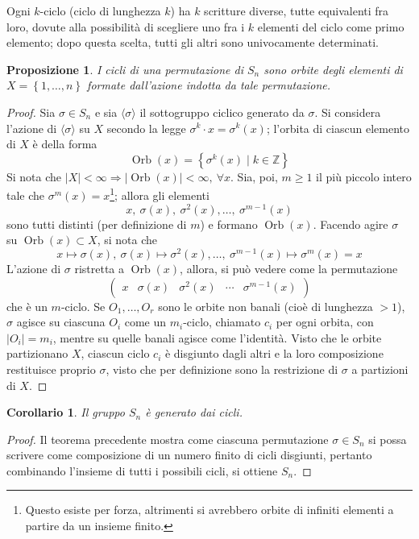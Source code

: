 \documentclass[12pt]{scrartcl}
\theoremstyle{style}
\newtheorem{prop}{Proposizione}[section]
\newtheorem{corollario}{Corollario}[teorema]
\numberwithin{equation}{subsection}
\begin{document}
Ogni $k$-ciclo (ciclo di lunghezza $k$) ha $k$ scritture diverse, tutte equivalenti fra loro, dovute alla possibilit\`a di scegliere uno fra i $k$ elementi del ciclo come primo elemento; dopo questa scelta, tutti gli altri sono univocamente determinati.
\begin{prop}
	I cicli di una permutazione di $S_n$ sono orbite degli elementi di $X = \left\{ 1,\ldots,n \right\} $ formate dall'azione indotta da tale permutazione.
\end{prop}
	\begin{proof}
		Sia $\sigma \in S_n$ e sia $\langle \sigma  \rangle$ il sottogruppo ciclico generato da $\sigma $.
		Si considera l'azione di $\langle \sigma  \rangle$ su $X$ secondo la legge $\sigma ^k \cdot x = \sigma ^k (x)$; l'orbita di ciascun elemento di $X$ \`e della forma
		\[
		\operatorname{Orb} (x) = \left\{ \sigma ^k(x)  \mid  k \in \mathbb{Z} \right\} 
		\] 
		Si nota che $\lvert X \rvert < \infty \Rightarrow  \lvert \operatorname{Orb} (x) \rvert < \infty, \ \forall x$. 
		Sia, poi, $m\ge 1$ il pi\`u piccolo intero tale che $\sigma ^m(x) = x$\footnote{Questo esiste per forza, altrimenti si avrebbero orbite di infiniti elementi a partire da un insieme finito.}; allora gli elementi 
		\[
		x, \ \sigma (x) , \ \sigma ^2 (x) , \ldots,\ \sigma ^{m-1} (x)
		\] 
		sono tutti distinti (per definizione di $m$) e formano $\operatorname{Orb} (x)$.
		Facendo agire $\sigma $ su $\operatorname{Orb} (x) \subset X$, si nota che 
		\[
		x \mapsto \sigma (x) , \ \sigma (x) \mapsto \sigma ^2(x) ,\ldots, \ \sigma ^{m-1} (x) \mapsto \sigma ^m(x) = x
		\] 
		L'azione di $\sigma $ ristretta a $\operatorname{Orb} (x)$, allora, si pu\`o vedere come la permutazione
		\[
			\begin{pmatrix} x & \sigma (x) & \sigma ^2 (x) & \cdots & \sigma ^{m-1} (x)\end{pmatrix} 
		\] 
		che \`e un $m$-ciclo. Se $O_1,\ldots,O_r$ sono le orbite non banali (cio\`e di lunghezza $>1$), $\sigma $ agisce su ciascuna $O_i$ come un $m_i$-ciclo, chiamato $c_i$ per ogni orbita, con $\lvert O_i \rvert = m_i$, mentre su quelle banali agisce come l'identit\`a.
Visto che le orbite partizionano $X$, ciascun ciclo $c_i$ \`e disgiunto dagli altri e la loro composizione restituisce proprio $\sigma $, visto che per definizione sono la restrizione di $\sigma $ a partizioni di $X$.
	\end{proof}
\begin{corollario}\label{sncic}
	Il gruppo $S_n$ \`e generato dai cicli.
\end{corollario}
	\begin{proof}
		Il teorema precedente mostra come ciascuna permutazione $\sigma \in S_n$ si possa scrivere come composizione di un numero finito di cicli disgiunti, pertanto combinando l'insieme di tutti i possibili cicli, si ottiene $S_n$.
	\end{proof}
\end{document}
